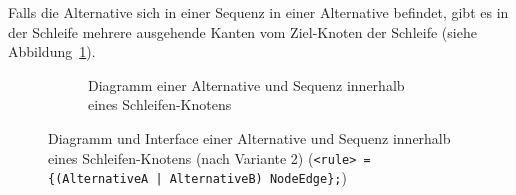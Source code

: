 \documentclass[../InterneDSLs.tex]{subfiles}
\begin{document}
Falls die Alternative sich in einer Sequenz in einer Alternative befindet, gibt es in der Schleife mehrere ausgehende Kanten vom Ziel-Knoten der Schleife (siehe Abbildung~\ref{FIG:DiagramAlternativeInLoop}).
\begin{figure}[ht]
\centering
  \begin{subfigure}[c]{0.49\textwidth}
    \caption{Diagramm einer Alternative und Sequenz innerhalb eines Schleifen-Knotens}
    \label{FIG:DiagramAlternativeInLoop}
  \end{subfigure}
  \begin{subfigure}[c]{0.49\textwidth}
    
  \end{subfigure}
  \caption{Diagramm und Interface einer Alternative und Sequenz innerhalb eines Schleifen-Knotens (nach Variante 2) (\texttt{<rule> = \{(AlternativeA | AlternativeB) NodeEdge\};})}
  \label{FIG:AlternativeInLoop}
\end{figure}
\end{document}
